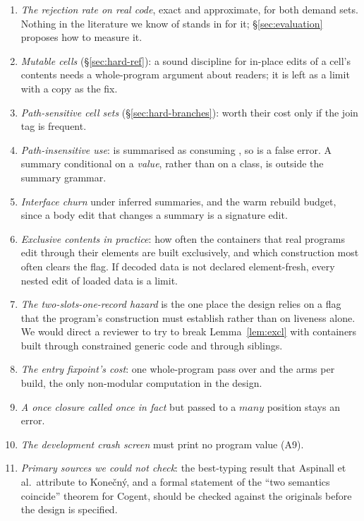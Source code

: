 \begin{enumerate}
\item \emph{The rejection rate on real code}, exact and approximate, for both demand sets. Nothing in the
literature we know of stands in for it; \S\ref{sec:evaluation} proposes how to measure it.
\item \emph{Mutable cells} (\S\ref{sec:hard-ref}): a sound discipline for in-place edits of a cell's
contents needs a whole-program argument about readers; it is left as a limit with a copy as the fix.
\item \emph{Path-sensitive cell sets} (\S\ref{sec:hard-branches}): worth their cost only if the join tag is
frequent.
\item \emph{Path-insensitive use}:  is summarised as consuming , so  is a false
error. A summary conditional on a \emph{value}, rather than on a class, is outside the summary grammar.
\item \emph{Interface churn} under inferred summaries, and the warm rebuild budget, since a body edit
that changes a summary is a signature edit.
\item \emph{Exclusive contents in practice}: how often the containers that real programs edit through
their elements are built exclusively, and which construction most often clears the flag. If decoded
data is not declared element-fresh, every nested edit of loaded data is a limit.
\item \emph{The two-slots-one-record hazard} is the one place the design relies on a flag that the
program's construction must establish rather than on liveness alone. We would direct a reviewer to try
to break Lemma~\ref{lem:excl} with containers built through constrained generic code and through
 siblings.
\item \emph{The entry fixpoint's cost}: one whole-program pass over  and the arms per build,
the only non-modular computation in the design.
\item \emph{A \textit{once} closure called once in fact} but passed to a $\mathit{many}$ position stays
an error.
\item \emph{The development crash screen} must print no program value (A9).
\item \emph{Primary sources we could not check}: the best-typing result that Aspinall et al.\ attribute
to Kone\v{c}n\'y, and a formal statement of the ``two semantics coincide'' theorem for Cogent, should be
checked against the originals before the design is specified.
\end{enumerate}
